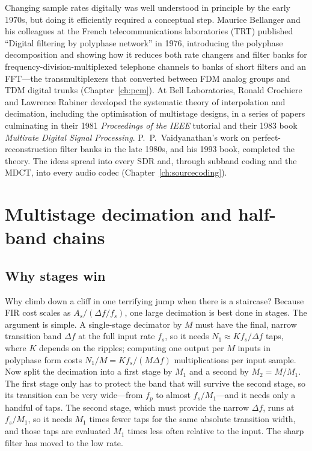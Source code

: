 \begin{history}
Changing sample rates digitally was well understood in principle by the early 1970s, but doing it
efficiently required a conceptual step. Maurice Bellanger and his colleagues at the French
telecommunications laboratories (TRT) published ``Digital filtering by polyphase network'' in
1976, introducing the polyphase decomposition and showing how it reduces both rate changers and
filter banks for frequency-division-multiplexed telephone channels to banks of short filters and
an FFT---the transmultiplexers that converted between FDM analog groups and TDM digital trunks
(Chapter~\ref{ch:pcm}). At Bell Laboratories, Ronald Crochiere and Lawrence Rabiner developed the
systematic theory of interpolation and decimation, including the optimisation of multistage
designs, in a series of papers culminating in their 1981 \emph{Proceedings of the IEEE} tutorial and
their 1983 book \emph{Multirate Digital Signal Processing}. P.~P.~Vaidyanathan's work on
perfect-reconstruction filter banks in the late 1980s, and his 1993 book, completed the theory.
The ideas spread into every SDR and, through subband coding and the MDCT, into every audio codec
(Chapter~\ref{ch:sourcecoding}).
\end{history}

\section{Multistage decimation and half-band chains}
\label{sec:ch06:multistage}

\subsection{Why stages win}

Why climb down a cliff in one terrifying jump when there is a staircase? Because FIR cost scales as
$A_s/(\Delta f/f_s)$, one large decimation is best done in stages. The argument is simple. A
single-stage decimator by $M$ must have the final, narrow transition band $\Delta f$ at the full
input rate $f_s$, so it needs $N_1\approx K f_s/\Delta f$ taps, where $K$ depends on the ripples;
computing one output per $M$ inputs in polyphase form costs $N_1/M=K f_s/(M\Delta f)$
multiplications per input sample. Now split the decimation into a first stage by $M_1$ and a second
by $M_2=M/M_1$. The first stage only has to protect the band that will survive the second stage, so
its transition can be very wide---from $f_p$ to almost $f_s/M_1$---and it needs only a handful of
taps. The second stage, which must provide the narrow $\Delta f$, runs at $f_s/M_1$, so it needs
$M_1$ times fewer taps for the same absolute transition width, and those taps are evaluated $M_1$
times less often relative to the input. The sharp filter has moved to the low rate.

